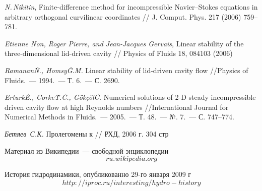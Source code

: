 \begin{thebibliography}{99}

  \textit{N.\,Nikitin}, Finite-difference method for incompressible Navier–Stokes equations in 
  arbitrary orthogonal curvilinear coordinates // J. Comput. Phys. 217 (2006) 759–781.

  \textit{Etienne Non, Roger Pierre, and Jean-Jacques Gervais}, Linear stability of the 
  three-dimensional lid-driven cavity // Physics of Fluids 18, 084103 (2006)
  
   \textit{Ramanan\.N., Homsy\.G.\.M.} Linear stability of lid-driven cavity flow 
  //Physics of Fluids.~--- 1994.~--- Т. 6.~--- С. 2690.
  
   \textit{Erturk\.E., Corke\.T.\.C., Gökçöl\.C.} Numerical solutions of 2-D steady incompressible
  driven cavity flow at high Reynolds numbers //International Journal for Numerical Methods in 
  Fluids.~--- 2005.~--- Т. 48.~--- №. 7.~--- С. 747--774.

   \textit{Бетяев~С.К.} Пролегомены к // РХД, 2006 г. 304 стр
  
   Материал из Википедии~--- свободной энциклопедии \[ru.wikipedia.org\]

   История гидродинамики, опубликованно 29-го января 2009 г \[http://iproc.ru/interesting/hydro-history\]

\end{thebibliography}
